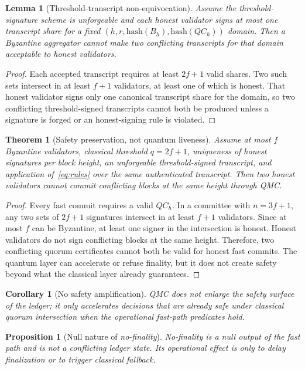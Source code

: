 \documentclass{ieeeaccess}
\newtheorem{lemma}{Lemma}
\newtheorem{theorem}{Theorem}
\newtheorem{proposition}{Proposition}
\newtheorem{corollary}{Corollary}
\begin{document}
\begin{lemma}[Threshold-transcript non-equivocation]
Assume the threshold-signature scheme is unforgeable and each honest validator signs at most one transcript share for a fixed $(h,r,\mathrm{hash}(B_h),\mathrm{hash}(QC_h))$ domain. Then a Byzantine aggregator cannot make two conflicting transcripts for that domain acceptable to honest validators.
\end{lemma}
\begin{proof}
Each accepted transcript requires at least $2f+1$ valid shares. Two such sets intersect in at least $f+1$ validators, at least one of which is honest. That honest validator signs only one canonical transcript share for the domain, so two conflicting threshold-signed transcripts cannot both be produced unless a signature is forged or an honest-signing rule is violated.
\end{proof}

\begin{theorem}[Safety preservation, not quantum liveness]
Assume at most $f$ Byzantine validators, classical threshold $q=2f+1$, uniqueness of honest signatures per block height, an unforgeable threshold-signed transcript, and application of~\eqref{eq:rules} over the same authenticated transcript. Then two honest validators cannot \textit{commit} conflicting blocks at the same height through QMC.
\end{theorem}
\begin{proof}
Every fast commit requires a valid $QC_h$. In a committee with $n=3f+1$, any two sets of $2f+1$ signatures intersect in at least $f+1$ validators. Since at most $f$ can be Byzantine, at least one signer in the intersection is honest. Honest validators do not sign conflicting blocks at the same height. Therefore, two conflicting quorum certificates cannot both be valid for honest fast commits. The quantum layer can accelerate or refuse finality, but it does not create safety beyond what the classical layer already guarantees.
\end{proof}

\begin{corollary}[No safety amplification]
QMC does not enlarge the safety surface of the ledger; it only accelerates decisions that are already safe under classical quorum intersection when the operational fast-path predicates hold.
\end{corollary}

\begin{proposition}[Null nature of \textit{no-finality}]
\textit{No-finality} is a null output of the fast path and is not a conflicting ledger state. Its operational effect is only to delay finalization or to trigger classical fallback.
\end{proposition}
\end{document}
